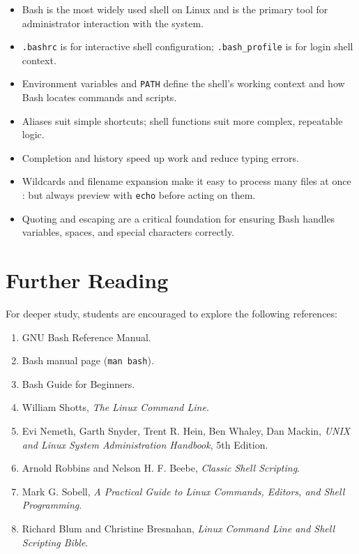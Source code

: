 \begin{itemize}
  \item Bash is the most widely used shell on Linux and is the primary tool
    for administrator interaction with the system.
  \item \texttt{.bashrc} is for interactive shell configuration; \texttt{.bash\_profile}
    is for login shell context.
  \item Environment variables and \texttt{PATH} define the shell's working
    context and how Bash locates commands and scripts.
  \item Aliases suit simple shortcuts; shell functions suit more complex,
    repeatable logic.
  \item Completion and history speed up work and reduce typing errors.
  \item Wildcards and filename expansion make it easy to process many files
    at once : but always preview with \texttt{echo} before acting on them.
  \item Quoting and escaping are a critical foundation for ensuring Bash
    handles variables, spaces, and special characters correctly.
\end{itemize}

\section{Further Reading}
\label{sec:bash-references}

For deeper study, students are encouraged to explore the following references:

\begin{enumerate}
  \item GNU Bash Reference Manual.
  \item Bash manual page (\texttt{man bash}).
  \item Bash Guide for Beginners.
  \item William Shotts, \textit{The Linux Command Line}.
  \item Evi Nemeth, Garth Snyder, Trent R. Hein, Ben Whaley, Dan Mackin,
    \textit{UNIX and Linux System Administration Handbook}, 5th Edition.
  \item Arnold Robbins and Nelson H. F. Beebe,
    \textit{Classic Shell Scripting}.
  \item Mark G. Sobell,
    \textit{A Practical Guide to Linux Commands, Editors, and Shell Programming}.
  \item Richard Blum and Christine Bresnahan,
    \textit{Linux Command Line and Shell Scripting Bible}.
\end{enumerate}
